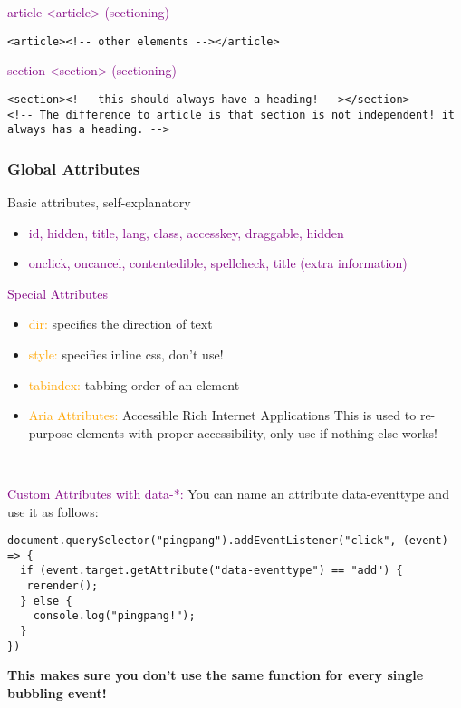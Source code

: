 \documentclass[main.tex,fontsize=6pt,paper=a4,paper=landscape,DIV=calc,]{scrartcl}
\begin{document}
\begin{multicols*}{4}
\textcolor{purple}{article <article> (sectioning)}
\vspace{-2mm}
\begin{lstlisting}
<article><!-- other elements --></article>
\end{lstlisting}
\vspace{2mm}

\textcolor{purple}{section <section> (sectioning)}
\vspace{-2mm}
\begin{lstlisting}
<section><!-- this should always have a heading! --></section>
<!-- The difference to article is that section is not independent! it always has a heading. -->
\end{lstlisting}
\vspace{2mm}

\subsubsection{Global Attributes}
Basic attributes, self-explanatory
\begin{itemize}
\item \textcolor{purple}{id, hidden, title, lang, class, accesskey, draggable, hidden}
\item \textcolor{purple}{onclick, oncancel, contentedible, spellcheck, title (extra information)}
\end{itemize} 

\textcolor{purple}{Special Attributes}
\begin{itemize}
\item \textcolor{orange}{dir:} specifies the direction of text
\item \textcolor{orange}{style:} specifies inline css, don't use!
\item \textcolor{orange}{tabindex:} tabbing order of an element
\item \textcolor{orange}{Aria Attributes:} Accessible Rich Internet Applications\newline
  This is used to re-purpose elements with proper accessibility, only use if nothing else works!
\end{itemize} 
\, \newline

\textcolor{purple}{Custom Attributes with data-*:}\newline
You can name an attribute data-eventtype and use it as follows:
\vspace{-2mm}
\begin{lstlisting}
document.querySelector("pingpang").addEventListener("click", (event) => { 
  if (event.target.getAttribute("data-eventtype") == "add") {
   rerender();
  } else {
    console.log("pingpang!");
  }
})
\end{lstlisting}
\vspace{2mm}
\textbf{This makes sure you don't use the same function for every single bubbling event!}\newline
\, \newline


\end{multicols*}
\end{document}
